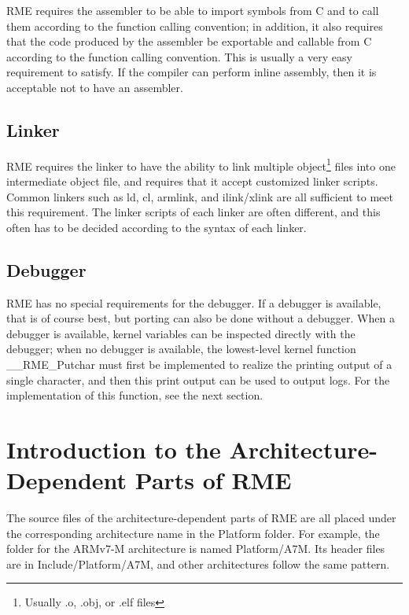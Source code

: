 RME requires the assembler to be able to import symbols from C and to call them according to the function calling convention; in addition, it also requires that the code produced by the assembler be exportable and callable from C according to the function calling convention. This is usually a very easy requirement to satisfy. If the compiler can perform inline assembly, then it is acceptable not to have an assembler.

\subsection{Linker}\label{subsec:7-linker}

RME requires the linker to have the ability to link multiple object\footnote{Usually .o, .obj, or .elf files} files into one intermediate object file, and requires that it accept customized linker scripts. Common linkers such as ld, cl, armlink, and ilink/xlink are all sufficient to meet this requirement. The linker scripts of each linker are often different, and this often has to be decided according to the syntax of each linker.

\subsection{Debugger}\label{subsec:7-debugger}

RME has no special requirements for the debugger. If a debugger is available, that is of course best, but porting can also be done without a debugger. When a debugger is available, kernel variables can be inspected directly with the debugger; when no debugger is available, the lowest-level kernel function \_\_RME\_Putchar must first be implemented to realize the printing output of a single character, and then this print output can be used to output logs. For the implementation of this function, see the next section.

\section{Introduction to the Architecture-Dependent Parts of RME}\label{sec:7-architecture-dependent-parts-overview}

The source files of the architecture-dependent parts of RME are all placed under the corresponding architecture name in the Platform folder. For example, the folder for the ARMv7-M architecture is named Platform/A7M. Its header files are in Include/Platform/A7M, and other architectures follow the same pattern.

